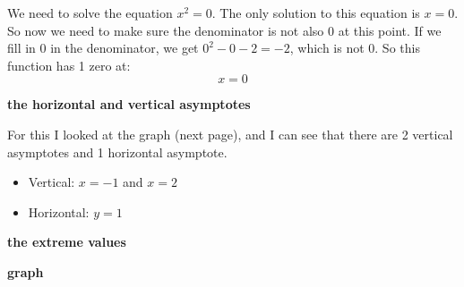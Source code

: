 \documentclass[11pt, a4paper]{article}
\begin{document}
We need to solve the equation $x^2 = 0$. The only solution to this equation is $x = 0$. So now we need to make sure the denominator is not also 0 at this point. If we fill in 0 in the denominator, we get $0^2 - 0 - 2 = -2$, which is not 0. So this function has 1 zero at:
\[
x = 0
\]

\textbf{the horizontal and vertical asymptotes}


For this I looked at the graph (next page), and I can see that there are 2 vertical asymptotes and 1 horizontal asymptote.

\begin{itemize}
	\item Vertical: $x = -1$ and $x = 2$
	\item Horizontal: $y = 1$
\end{itemize}







\textbf{the extreme values}



\pagebreak
\textbf{graph}
\end{document}

